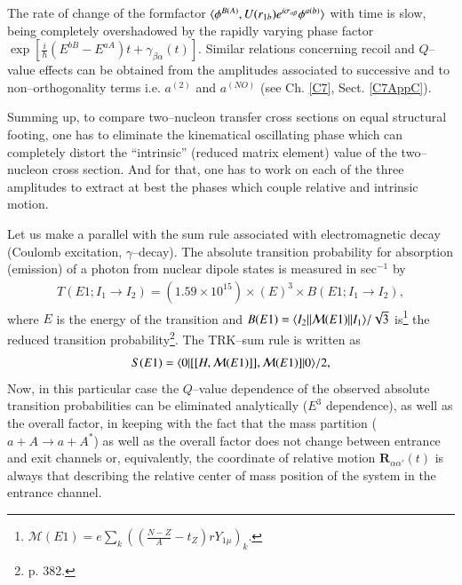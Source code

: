 \begin{subappendices}
 
 The rate of change of the formfactor $\langle {\phi^{B(A)},U(r_{1b})e^{i\sigma_{\alpha\beta}}\phi^{a(b)}} \rangle$ with time is slow, being completely overshadowed by the rapidly varying phase factor\\ $\exp\left[\frac{i}{\hbar}(E^{bB}-E^{aA})t+\gamma_{\beta\alpha}(t)\right]$. Similar relations concerning recoil and $Q$--value effects can be obtained from the amplitudes associated to successive and to non--orthogonality terms i.e. $a^{(2)}$ and $a^{(NO)}$ (see Ch. \ref{C7}, Sect. \ref{C7AppC}).
 
 
 Summing up, to compare two--nucleon transfer cross sections on equal structural footing, one has to eliminate the kinematical oscillating phase which can completely distort the ``intrinsic'' (reduced matrix element) value of the two--nucleon cross section. And for that, one has to work on each of the three amplitudes to extract at best the phases which couple relative and intrinsic motion.
 
 
 
 Let us make a parallel with the sum rule associated with electromagnetic decay (Coulomb excitation, $\gamma$--decay). The absolute transition probability for absorption (emission) of a photon from nuclear dipole states is measured in sec$^{-1}$ by
 \begin{align}
 T(E1;I_1\to I_2)=\left(1.59\times 10^{15}\right)\times (E)^3\times B(E1;I_1\to I_2),
 \end{align}
 where $E$ is the energy of the transition and $B(E1)=\langle {I_2||\mathcal M(E1)||I_1} \rangle/\sqrt{3}$ is\footnote{$\mathcal M(E1)=e\sum_k\left(\left(\frac{N-Z}{A}-t_Z\right)rY_{1\mu}\right)_k$.} the reduced transition probability\footnote{\cite{Bohr:69} p. 382.}. The TRK--sum rule is written as
 \begin{align}
 S(E1)=\langle {0}|[[H,\mathcal M(E1)]],\mathcal M(E1)]|{0} \rangle/2,
 \end{align}
 Now, in this particular case the $Q$--value dependence of the observed absolute transition probabilities can be eliminated analytically ($E^3$ dependence), as well as the overall factor, in keeping with the fact that the mass partition ($a+A\rightarrow a+A^*$) as well as the overall factor does not change between entrance and exit channels or, equivalently, the coordinate of relative motion $\mathbf R_{\alpha\alpha'}(t)$ is always that describing the relative center of mass position of the system in the entrance channel. 
 

\end{subappendices}
